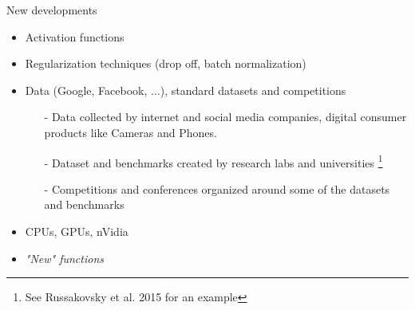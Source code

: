 \begin{frame}{New developments}
	\begin{itemize}
		\item Activation functions  
		\item Regularization techniques (drop off, batch normalization) 
		\item Data (Google, Facebook,  $\dots$), standard datasets and competitions 
		\begin{itemize}
			\item[-] Data collected by internet and social media companies, digital consumer 
			products like Cameras and Phones.  
			\item[-] Dataset and  benchmarks created by research labs and universities
				\footnote[frame]{See Russakovsky et al. 2015 for an example}  
			\item[-] Competitions and conferences organized around some of the datasets and 
			benchmarks  
		\end{itemize}
		\item CPUs, GPUs, nVidia
		\item {\it "New" functions} 
	\end{itemize}
\end{frame}

